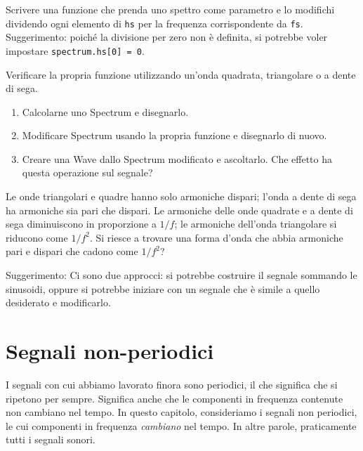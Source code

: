 \documentclass[12pt,a4paper]{book}
\begin{document}
\begin{exercise} Scrivere una funzione che prenda uno spettro come parametro e lo modifichi dividendo ogni elemento di {\tt hs} per la frequenza corrispondente da {\tt fs}. Suggerimento: poiché la divisione per zero non è definita, si potrebbe voler impostare {\tt spectrum.hs[0] = 0}.

Verificare la propria funzione utilizzando un'onda quadrata, triangolare o a dente di sega.

\begin{enumerate} 

\item Calcolarne uno Spectrum e disegnarlo.

\item Modificare Spectrum usando la propria funzione e disegnarlo di nuovo.

\item Creare una Wave dallo Spectrum modificato e ascoltarlo. Che effetto ha questa operazione sul segnale?

\end{enumerate} 

\end{exercise} 

\begin{exercise} Le onde triangolari e quadre hanno solo armoniche dispari; l'onda a dente di sega ha armoniche sia pari che dispari. Le armoniche delle onde quadrate e a dente di sega diminuiscono in proporzione a $1/f$; le armoniche dell'onda triangolare si riducono come $1/f^2$. Si riesce a trovare una forma d'onda che abbia armoniche pari e dispari che cadono come $1/f^2$?

Suggerimento: Ci sono due approcci: si potrebbe costruire il segnale sommando le sinusoidi, oppure si potrebbe iniziare con un segnale che è simile a quello desiderato e modificarlo. \end{exercise} 

\chapter{Segnali non-periodici} \label{nonperiodic} 

I segnali con cui abbiamo lavorato finora sono periodici, il che significa che si ripetono per sempre. Significa anche che le componenti in frequenza contenute non cambiano nel tempo. In questo capitolo, consideriamo i segnali non periodici, le cui componenti in frequenza {\em cambiano} nel tempo. In altre parole, praticamente tutti i segnali sonori.
\end{document}
